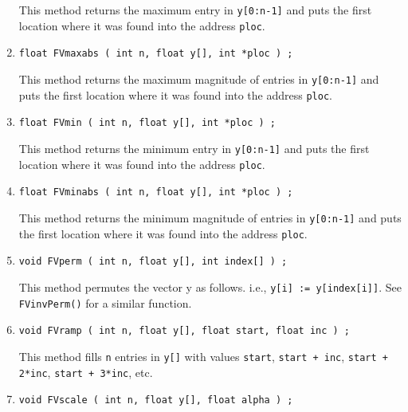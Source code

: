 \begin{enumerate}
This method returns the maximum entry in {\tt y[0:n-1]}
and puts the first location where it was found into the address
{\tt ploc}.
\item
\begin{verbatim}
float FVmaxabs ( int n, float y[], int *ploc ) ;
\end{verbatim}
This method returns the maximum magnitude of entries in 
{\tt y[0:n-1]} and puts the first location where 
it was found into the address {\tt ploc}.
\item
\begin{verbatim}
float FVmin ( int n, float y[], int *ploc ) ;
\end{verbatim}
This method returns the minimum entry in {\tt y[0:n-1]}
and puts the first location where it was found into the address
{\tt ploc}.
\item
\begin{verbatim}
float FVminabs ( int n, float y[], int *ploc ) ;
\end{verbatim}
This method returns the minimum magnitude of entries in 
{\tt y[0:n-1]} and puts the first location where 
it was found into the address {\tt ploc}.
\item
\begin{verbatim}
void FVperm ( int n, float y[], int index[] ) ;
\end{verbatim}
This method permutes the vector y as follows.
i.e.,
{\tt y[i] := y[index[i]]}.
See {\tt FVinvPerm()} for a similar function.
\item
\begin{verbatim}
void FVramp ( int n, float y[], float start, float inc ) ;
\end{verbatim}
This method fills {\tt n} entries in {\tt y[]} with 
values 
{\tt start},
{\tt start + inc},
{\tt start + 2*inc},
{\tt start + 3*inc}, etc.
\item
\begin{verbatim}
void FVscale ( int n, float y[], float alpha ) ;

\end{verbatim}
\end{enumerate}
